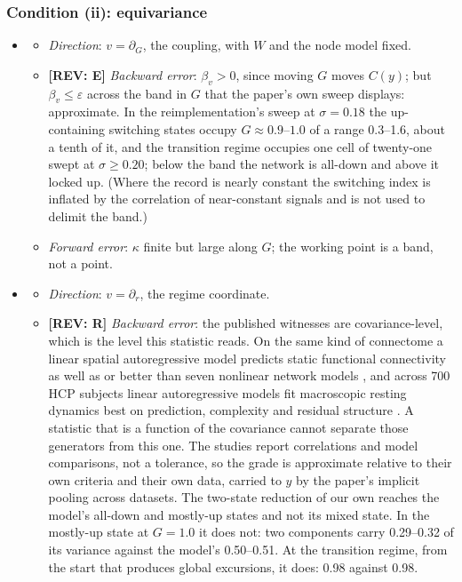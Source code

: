 \documentclass[11pt]{article}
\newcommand{\REV}[1]{\textcolor{purple!70!black}{\textbf{[REV: #1]}}}
\begin{document}
\subsubsection{Condition (ii): equivariance}
\begin{itemize}
\item[$\Theta_1$]
  \begin{itemize}
  \item \emph{Direction}: $v=\partial_G$, the coupling, with $W$ and the node model fixed.
  \item \REV{E} \emph{Backward error}: $\beta_v>0$, since moving $G$ moves $C(y)$; but $\beta_v\le\varepsilon$ across the band in $G$ that the paper's own sweep displays: approximate. In the reimplementation's sweep at $\sigma=0.18$ the up-containing switching states occupy $G\approx0.9$--$1.0$ of a range 0.3--1.6, about a tenth of it, and the transition regime occupies one cell of twenty-one swept at $\sigma\ge0.20$; below the band the network is all-down and above it locked up. (Where the record is nearly constant the switching index is inflated by the correlation of near-constant signals and is not used to delimit the band.)
  \item \emph{Forward error}: $\kappa$ finite but large along $G$; the working point is a band, not a point.
  \end{itemize}
\item[$\Theta_2$]
  \begin{itemize}
  \item \emph{Direction}: $v=\partial_r$, the regime coordinate.
  \item \REV{R} \emph{Backward error}: the published witnesses are covariance-level, which is the level this statistic reads. On the same kind of connectome a linear spatial autoregressive model predicts static functional connectivity as well as or better than seven nonlinear network models \parencite{messe2014,messe2015}, and across 700 HCP subjects linear autoregressive models fit macroscopic resting dynamics best on prediction, complexity and residual structure \parencite{nozari2024}. A statistic that is a function of the covariance cannot separate those generators from this one. The studies report correlations and model comparisons, not a tolerance, so the grade is approximate relative to their own criteria and their own data, carried to $y$ by the paper's implicit pooling across datasets. The two-state reduction of our own reaches the model's all-down and mostly-up states and not its mixed state. In the mostly-up state at $G=1.0$ it does not: two components carry 0.29--0.32 of its variance against the model's 0.50--0.51. At the transition regime, from the start that produces global excursions, it does: 0.98 against 0.98.

\end{itemize}
\end{itemize}
\end{document}
